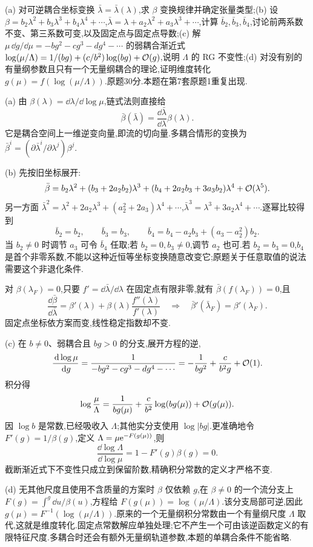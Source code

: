 \begin{exercise}
(a) 对可逆耦合坐标变换 $\bar\lambda=\bar\lambda(\lambda)$,求 $\beta$ 变换规律并确定张量类型;(b) 设 $\beta=b_2\lambda^2+b_3\lambda^3+b_4\lambda^4+\cdots$,$\bar\lambda=\lambda+a_2\lambda^2+a_3\lambda^3+\cdots$,计算 $\bar b_2,\bar b_3,\bar b_4$,讨论前两系数不变、第三系数可变,以及固定点与固定点导数;(c) 解 $\mu\,\dd g/\dd\mu=-bg^2-cg^3-dg^4-\cdots$ 的弱耦合渐近式 $\log(\mu/\Lambda)=1/(bg)+(c/b^2)\log(bg)+\mathcal O(g)$,说明 $\Lambda$ 的 RG 不变性;(d) 对没有别的有量纲参数且只有一个无量纲耦合的理论,证明维度转化 $g(\mu)=f(\log(\mu/\Lambda))$.原题30分.本题在第7套原题1重复出现.
\end{exercise}
\begin{solution}
(a) 由 $\beta(\lambda)=\dd\lambda/\dd\log\mu$,链式法则直接给
\[
\bar\beta(\bar\lambda)=\frac{\dd\bar\lambda}{\dd\lambda}\beta(\lambda).
\]
它是耦合空间上一维逆变向量,即流的切向量.多耦合情形的变换为 $\bar\beta^i=(\partial\bar\lambda^i/\partial\lambda^j)\beta^j$.

(b) 先按旧坐标展开:
\[
\bar\beta=b_2\lambda^2+(b_3+2a_2b_2)\lambda^3
+(b_4+2a_2b_3+3a_3b_2)\lambda^4+\mathcal O(\lambda^5).
\]
另一方面 $\bar\lambda^2=\lambda^2+2a_2\lambda^3+(a_2^2+2a_3)\lambda^4+\cdots$,$\bar\lambda^3=\lambda^3+3a_2\lambda^4+\cdots$.逐幂比较得到
\[
\bar b_2=b_2,\qquad \bar b_3=b_3,\qquad
\bar b_4=b_4-a_2b_3+(a_3-a_2^2)b_2.
\]
当 $b_2\ne0$ 时调节 $a_3$ 可令 $\bar b_4$ 任取;若 $b_2=0,b_3\ne0$,调节 $a_2$ 也可.若 $b_2=b_3=0$,$b_4$ 是首个非零系数,不能以这种近恒等坐标变换随意改变它;原题关于任意取值的说法需要这个非退化条件.

对 $\beta(\lambda_F)=0$,只要 $f'=\dd\bar\lambda/\dd\lambda$ 在固定点有限非零,就有 $\bar\beta(f(\lambda_F))=0$,且
\[
\frac{\dd\bar\beta}{\dd\bar\lambda}
=\beta'(\lambda)+\beta(\lambda)\frac{f''(\lambda)}{f'(\lambda)}
\quad\Longrightarrow\quad
\bar\beta'(\bar\lambda_F)=\beta'(\lambda_F).
\]
固定点坐标依方案而变,线性稳定指数却不变.

(c) 在 $b\ne0$、弱耦合且 $bg>0$ 的分支,展开方程的逆,
\[
\frac{\,\mathrm d\log\mu}{\,\mathrm d g}
=\frac1{-bg^2-cg^3-dg^4-\cdots}
=-\frac1{bg^2}+\frac c{b^2g}+\mathcal O(1).
\]
积分得
\[
\log\frac\mu\Lambda=\frac1{bg(\mu)}+
\frac c{b^2}\log(bg(\mu))+\mathcal O(g(\mu)).
\]
因 $\log b$ 是常数,已经吸收入 $\Lambda$;其他实分支使用 $\log|bg|$.更准确地令 $F'(g)=1/\beta(g)$,定义 $\Lambda=\mu\mathrm e^{-F(g(\mu))}$,则
\[
\frac{\dd\log\Lambda}{\dd\log\mu}
=1-F'(g)\beta(g)=0.
\]
截断渐近式下不变性只成立到保留阶数,精确积分常数的定义才严格不变.

(d) 无其他尺度且使用不含质量的方案时 $\beta$ 仅依赖 $g$,在 $\beta\ne0$ 的一个流分支上 $F(g)=\int^g\dd u/\beta(u)$,方程给 $F(g(\mu))=\log(\mu/\Lambda)$.该分支局部可逆,因此 $g(\mu)=F^{-1}(\log(\mu/\Lambda))$.原来的一个无量纲积分常数由一个有量纲尺度 $\Lambda$ 取代,这就是维度转化.固定点常数解应单独处理;它不产生一个可由该逆函数定义的有限特征尺度.多耦合时还会有额外无量纲轨道参数,本题的单耦合条件不能省略.
\end{solution}
